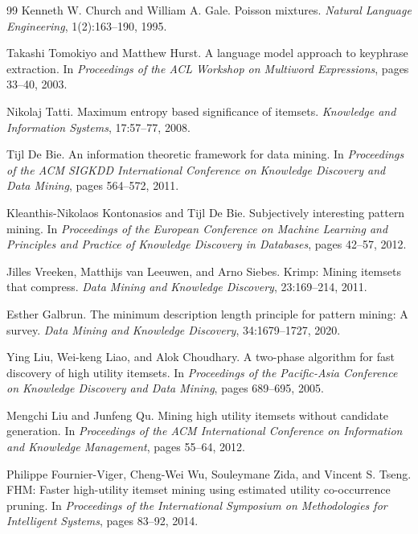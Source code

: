 \documentclass[11pt,a4paper]{article}
\begin{document}
\begin{thebibliography}{99}
Kenneth W. Church and William A. Gale.
\newblock Poisson mixtures.
\newblock \emph{Natural Language Engineering}, 1(2):163--190, 1995.

Takashi Tomokiyo and Matthew Hurst.
\newblock A language model approach to keyphrase extraction.
\newblock In \emph{Proceedings of the ACL Workshop on Multiword Expressions}, pages 33--40, 2003.

Nikolaj Tatti.
\newblock Maximum entropy based significance of itemsets.
\newblock \emph{Knowledge and Information Systems}, 17:57--77, 2008.

Tijl De Bie.
\newblock An information theoretic framework for data mining.
\newblock In \emph{Proceedings of the ACM SIGKDD International Conference on Knowledge Discovery and Data Mining}, pages 564--572, 2011.

Kleanthis-Nikolaos Kontonasios and Tijl De Bie.
\newblock Subjectively interesting pattern mining.
\newblock In \emph{Proceedings of the European Conference on Machine Learning and Principles and Practice of Knowledge Discovery in Databases}, pages 42--57, 2012.

Jilles Vreeken, Matthijs van Leeuwen, and Arno Siebes.
\newblock Krimp: Mining itemsets that compress.
\newblock \emph{Data Mining and Knowledge Discovery}, 23:169--214, 2011.

Esther Galbrun.
\newblock The minimum description length principle for pattern mining: A survey.
\newblock \emph{Data Mining and Knowledge Discovery}, 34:1679--1727, 2020.

Ying Liu, Wei-keng Liao, and Alok Choudhary.
\newblock A two-phase algorithm for fast discovery of high utility itemsets.
\newblock In \emph{Proceedings of the Pacific-Asia Conference on Knowledge Discovery and Data Mining}, pages 689--695, 2005.

Mengchi Liu and Junfeng Qu.
\newblock Mining high utility itemsets without candidate generation.
\newblock In \emph{Proceedings of the ACM International Conference on Information and Knowledge Management}, pages 55--64, 2012.

Philippe Fournier-Viger, Cheng-Wei Wu, Souleymane Zida, and Vincent S. Tseng.
\newblock FHM: Faster high-utility itemset mining using estimated utility co-occurrence pruning.
\newblock In \emph{Proceedings of the International Symposium on Methodologies for Intelligent Systems}, pages 83--92, 2014.


\end{thebibliography}
\end{document}

